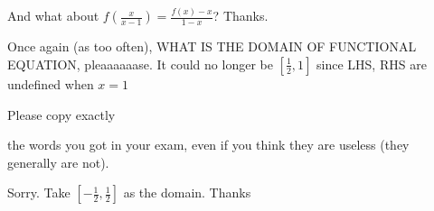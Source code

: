 \begin{solution}
	\begin{tcolorbox}And what about $f\left(\frac{x}{x-1}\right)=\frac{f(x)-x}{1-x}$? Thanks.\end{tcolorbox}
Once again (as too often), WHAT IS THE DOMAIN OF FUNCTIONAL EQUATION, pleaaaaaase.
It could no longer be $[\frac 12,1]$ since LHS, RHS are undefined when $x=1$

Please copy exactly the words you got in your exam, even if you think they are useless (they generally are not).



\end{solution}



\begin{solution}
	Sorry. Take $\left[-\frac{1}{2},\frac{1}{2}\right]$ as the domain. Thanks
\end{solution}



